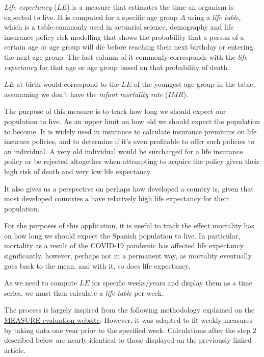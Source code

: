 \documentclass[
  a4paper]{article}
\begin{document}
\emph{Life expectancy} (\(LE\)) is a measure that estimates the time an
organism is expected to live. It is computed for a specific age group
\(A\) using a \emph{life table}, which is a table commonly used in
actuarial science, demography and life insurance policy risk modelling
that shows the probability that a person of a certain age or age group
will die before reaching their next birthday or entering the next age
group. The last column of it commonly corresponds with the \emph{life
expectancy} for that age or age group based on that probability of
death.

\(LE\) at birth would correspond to the \(LE\) of the youngest age group
in the table, assumming we don't have the \emph{infant mortality rate}
(\(IMR\)).

The purpose of this measure is to track how long we should expect our
population to live. As an upper limit on how old we should expect the
population to become. It is widely used in insurance to calculate
insurance premiums on life insurace policies, and to determine if it's
even profitable to offer such policies to an individual. A very old
individual would be surcharged for a life insurance policy or be
rejected altogether when attempting to acquire the policy given their
high risk of death and very low life expectancy.

It also gives us a perspective on perhaps how developed a country is,
given that most developed countries a have relatively high life
expectancy for their population.

For the purposes of this application, it is useful to track the effect
mortality has on how long we should expect the Spanish population to
live. In particular, mortality as a result of the COVID-19 pandemic has
affected life expectancy significantly, however, perhaps not in a
permanent way, as mortality eventually goes back to the mean, and with
it, so does life expectancy.

As we need to compute \(LE\) for specific weeks/years and display them
as a time series, we must then calculate a \emph{life table} per week.

The process is largely inspired from the following methodology explained
on the
\href{https://www.measureevaluation.org/resources/training/online-courses-and-resources/non-certificate-courses-and-mini-tutorials/multiple-decrement-life-tables/lesson-3.html}{MEASURE
evaluation website}. However, it was adapted to fit weekly measures by
taking data one year prior to the specified week. Calculations after the
step 2 described below are nearly identical to those displayed on the
previously linked article.
\end{document}
